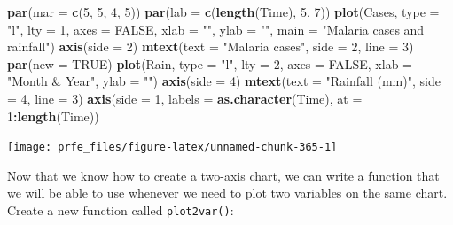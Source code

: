 \documentclass[12pt,a4paper]{book}
\newenvironment{Shaded}{\begin{snugshade}}{\end{snugshade}}
\newcommand{\KeywordTok}[1]{\textcolor[rgb]{0.13,0.29,0.53}{\textbf{#1}}}
\newcommand{\DataTypeTok}[1]{\textcolor[rgb]{0.13,0.29,0.53}{#1}}
\newcommand{\DecValTok}[1]{\textcolor[rgb]{0.00,0.00,0.81}{#1}}
\newcommand{\StringTok}[1]{\textcolor[rgb]{0.31,0.60,0.02}{#1}}
\newcommand{\OtherTok}[1]{\textcolor[rgb]{0.56,0.35,0.01}{#1}}
\newcommand{\OperatorTok}[1]{\textcolor[rgb]{0.81,0.36,0.00}{\textbf{#1}}}
\newcommand{\NormalTok}[1]{#1}
\theoremstyle{definition}
\theoremstyle{definition}
\theoremstyle{definition}
\theoremstyle{remark}
\begin{document}
\begin{Shaded}
\begin{Highlighting}[]
\KeywordTok{par}\NormalTok{(}\DataTypeTok{mar =} \KeywordTok{c}\NormalTok{(}\DecValTok{5}\NormalTok{, }\DecValTok{5}\NormalTok{, }\DecValTok{4}\NormalTok{, }\DecValTok{5}\NormalTok{))}
\KeywordTok{par}\NormalTok{(}\DataTypeTok{lab =} \KeywordTok{c}\NormalTok{(}\KeywordTok{length}\NormalTok{(Time), }\DecValTok{5}\NormalTok{, }\DecValTok{7}\NormalTok{))}
\KeywordTok{plot}\NormalTok{(Cases, }\DataTypeTok{type =} \StringTok{"l"}\NormalTok{, }\DataTypeTok{lty =} \DecValTok{1}\NormalTok{, }\DataTypeTok{axes =} \OtherTok{FALSE}\NormalTok{,}
     \DataTypeTok{xlab =} \StringTok{""}\NormalTok{, }\DataTypeTok{ylab =} \StringTok{""}\NormalTok{, }\DataTypeTok{main =} \StringTok{"Malaria cases and rainfall"}\NormalTok{)}
\KeywordTok{axis}\NormalTok{(}\DataTypeTok{side =} \DecValTok{2}\NormalTok{)}
\KeywordTok{mtext}\NormalTok{(}\DataTypeTok{text =} \StringTok{"Malaria cases"}\NormalTok{, }\DataTypeTok{side =} \DecValTok{2}\NormalTok{, }\DataTypeTok{line =} \DecValTok{3}\NormalTok{)}
\KeywordTok{par}\NormalTok{(}\DataTypeTok{new =} \OtherTok{TRUE}\NormalTok{)}
\KeywordTok{plot}\NormalTok{(Rain, }\DataTypeTok{type =} \StringTok{"l"}\NormalTok{, }\DataTypeTok{lty =} \DecValTok{2}\NormalTok{, }\DataTypeTok{axes =} \OtherTok{FALSE}\NormalTok{,}
     \DataTypeTok{xlab =} \StringTok{"Month & Year"}\NormalTok{, }\DataTypeTok{ylab =} \StringTok{""}\NormalTok{)}
\KeywordTok{axis}\NormalTok{(}\DataTypeTok{side =} \DecValTok{4}\NormalTok{)}
\KeywordTok{mtext}\NormalTok{(}\DataTypeTok{text =} \StringTok{"Rainfall (mm)"}\NormalTok{, }\DataTypeTok{side =} \DecValTok{4}\NormalTok{, }\DataTypeTok{line =} \DecValTok{3}\NormalTok{)}
\KeywordTok{axis}\NormalTok{(}\DataTypeTok{side =} \DecValTok{1}\NormalTok{, }\DataTypeTok{labels =} \KeywordTok{as.character}\NormalTok{(Time), }\DataTypeTok{at =} \DecValTok{1}\OperatorTok{:}\KeywordTok{length}\NormalTok{(Time))}
\end{Highlighting}
\end{Shaded}

\begin{center}\texttt{[image: prfe\_files/figure-latex/unnamed-chunk-365-1]} \end{center}

\newpage

Now that we know how to create a two-axis chart, we can write a function
that we will be able to use whenever we need to plot two variables on
the same chart. Create a new function called \texttt{plot2var()}:
\end{document}
